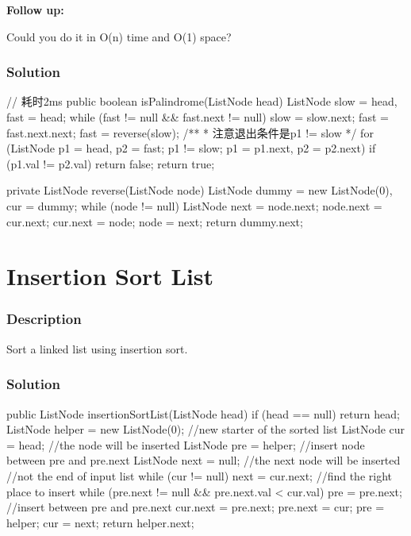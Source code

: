\textbf{Follow up:}

Could you do it in O(n) time and O(1) space?

\subsubsection{Solution}

\begin{Code}
// 耗时2ms
public boolean isPalindrome(ListNode head) {
    ListNode slow = head, fast = head;
    while (fast != null && fast.next != null) {
        slow = slow.next;
        fast = fast.next.next;
    }
    fast = reverse(slow);
    /**
     * 注意退出条件是p1 != slow
     */
    for (ListNode p1 = head, p2 = fast; p1 != slow; p1 = p1.next, p2 = p2.next) {
        if (p1.val != p2.val) {
            return false;
        }
    }
    return true;
}

private ListNode reverse(ListNode node) {
    ListNode dummy = new ListNode(0), cur = dummy;
    while (node != null) {
        ListNode next = node.next;
        node.next = cur.next;
        cur.next = node;
        node = next;
    }
    return dummy.next;
}
\end{Code}

\newpage

\section{Insertion Sort List} %

\subsubsection{Description}
Sort a linked list using insertion sort.

\subsubsection{Solution}

\begin{Code}
public ListNode insertionSortList(ListNode head) {
    if (head == null) {
        return head;
    }
    ListNode helper = new ListNode(0); //new starter of the sorted list
    ListNode cur = head; //the node will be inserted
    ListNode pre = helper; //insert node between pre and pre.next
    ListNode next = null; //the next node will be inserted
    //not the end of input list
    while (cur != null) {
        next = cur.next;
        //find the right place to insert
        while (pre.next != null && pre.next.val < cur.val) {
            pre = pre.next;
        }
        //insert between pre and pre.next
        cur.next = pre.next;
        pre.next = cur;
        pre = helper;
        cur = next;
    }
    return helper.next;
}
\end{Code}

